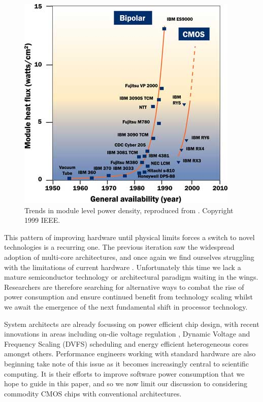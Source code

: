 \begin{figure}[ht]
\centering
\includegraphics[width=0.9\linewidth]{Images/bipolarcmos.jpg}
\caption{Trends in module level power density, reproduced from \cite{chu:1999aa}. Copyright 1999 IEEE.}
\end{figure}
This pattern of improving hardware until physical limits forces a switch to novel technologies is a recurring one. The previous iteration saw the widespread adoption of multi-core architectures, and once again we find ourselves struggling with the limitations of current hardware \cite{esmaeilzadeh:2011aa}. Unfortunately this time we lack a mature semiconductor technology or architectural paradigm waiting in the wings. Researchers are therefore searching for alternative ways to combat the rise of power consumption and ensure continued benefit from technology scaling whilst we await the emergence of the next fundamental shift in processor technology. \golden

System architects are already focussing on power efficient chip design, with recent innovations in areas including on-die voltage regulation \cite{burton:2014aa}, Dynamic Voltage and Frequency Scaling (DVFS) scheduling \cite{kwon:2013aa} and energy efficient heterogeneous cores~\cite{gupta:2012aa} amongst others. Performance engineers working with standard hardware are also beginning take note of this issue as it becomes increasingly central to scientific computing. It is their efforts to improve software power consumption that we hope to guide in this paper, and so we now limit our discussion to considering commodity CMOS chips with conventional architectures.

